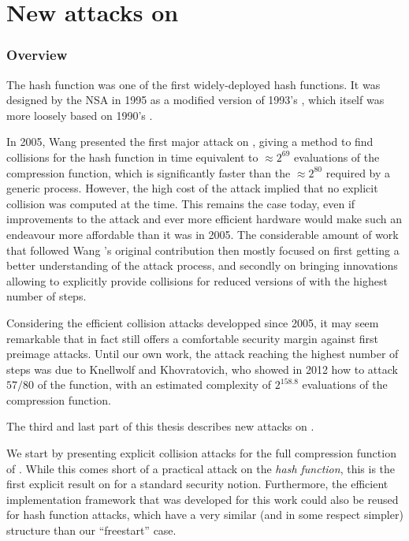 \part[Nouvelles attaques sur \shaone]
    {New attacks on \shaone} 
\label{part:sha-1}

\section*{Overview}
\pagestyle{plain}

The \shaone hash function was one of the first widely-deployed hash functions. It was designed by the NSA in 1995 as a modified version of 1993's \shazero, which itself
was more loosely based on 1990's \mdfour.

In 2005, Wang \etal presented the first major attack on \shaone, giving a method to find collisions for the hash function
in time equivalent to $\approx 2^{69}$ evaluations of the compression function, which is significantly faster than the $\approx 2^{80}$ required by a generic process.
However, the high cost of the attack implied that no explicit collision was computed at the time. This remains the case today, even if improvements to the attack
and ever more efficient hardware would make such an endeavour more affordable than it was in 2005.
The considerable amount of work that followed Wang \etal's original contribution then mostly focused on first getting a better understanding of the attack process, and
secondly on bringing innovations allowing to explicitly provide collisions for reduced versions of \shaone with the highest number of steps. 

Considering the efficient collision attacks developped since 2005, it may seem remarkable that \shaone
in fact still offers a comfortable security margin against first preimage attacks. Until our own work,
the attack reaching the highest number of steps was due to Knellwolf and Khovratovich, who showed in 2012 how to attack $57/80$ of the function, with an estimated
complexity of $2^{158.8}$ evaluations of the compression function.


\bigskip

The third and last part of this thesis describes new attacks on \shaone.

We start by presenting explicit collision attacks for the full compression function of \shaone. While this comes short of a practical
attack on the \emph{hash function}, this is the first explicit result on \shaone for a standard security notion. Furthermore, the efficient implementation framework that was developed
for this work could also be reused for hash function attacks, which have a very similar (and in some respect simpler) structure than our ``freestart'' case.

